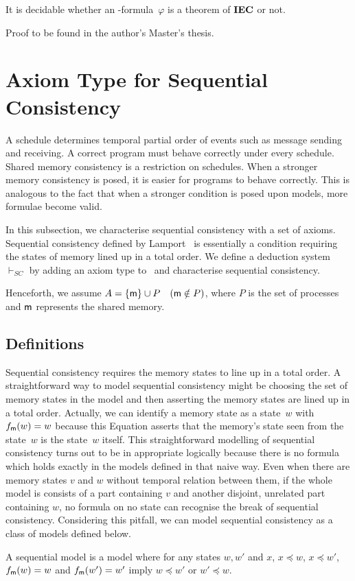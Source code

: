 \begin{proposition}[Decidability]
 \label{decidability}
 It is decidable whether an \iec-formula~$\varphi$ is a theorem of ${\rm {\textbf{IEC}}}$ or not.
\end{proposition}
Proof to be found in the author's Master's thesis.

  \section{Axiom Type for Sequential Consistency}
  \label{sc}

 A schedule determines temporal partial order of events such as
 message sending and receiving.
 A correct program must behave correctly under every schedule.
 Shared memory consistency is a restriction on schedules.
 When a stronger memory consistency is posed, it is easier for programs to behave
 correctly.  This is analogous to the fact
 that when a stronger condition
 is posed upon models, more formulae become valid.

 In this subsection, we characterise sequential consistency with a set of axioms.
 Sequential consistency defined by Lamport~\cite{lamport1979make} is essentially a condition requiring the states of memory lined up
 in a total order.
 We define a deduction system $\vdash_{SC}$ by adding an axiom type to \iec\, and
 characterise sequential consistency.

 Henceforth, we assume $A = \{{\sf m}\}\cup P\quad ({\sf m}\notin P)$, where $P$ is the
 set of processes and ${\sf m}$ represents the shared memory.

  \subsection{Definitions}

  Sequential consistency requires
  the memory states to line up in a total order.
  A straightforward way to model sequential consistency might be
  choosing the set of memory states in the model
  and then asserting the memory states are lined up in a total order.
  Actually, we can identify a memory state as a state~$w$ with
  $f_{\sf m}(w) = w$ because this Equation asserts that
  the memory's state seen from the state~$w$ is the state~$w$ itself.
  This straightforward modelling of sequential consistency turns out to be
  in appropriate logically because there is no formula which holds exactly
  in the models defined in that naive way.
  Even when there are memory states $v$ and $w$ without
  temporal relation between them,
  if the whole model is consists of a part containing $v$ and another disjoint,
  unrelated part
  containing $w$,
  no formula on no state can recognise the break of sequential consistency.
  Considering this pitfall, we can model sequential consistency as a class of models defined below.
  \begin{definition}
   A sequential model is a model where for any states $w, w'$ and $x$,
   $x\preceq w$, $x\preceq w'$, $f_{\sf m}(w) = w$ and $f_{\sf m}(w') = w'$ imply
   $w\preceq w'$ or $w'\preceq w$.
  \end{definition}

